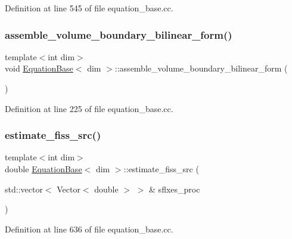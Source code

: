 Definition at line 545 of file equation\+\_\+base.\+cc.

\mbox{\label{class_equation_base_a42472101cbaeab32d22c4e8ff1dc9830}} 
\subsubsection{\texorpdfstring{assemble\+\_\+volume\+\_\+boundary\+\_\+bilinear\+\_\+form()}{assemble\_volume\_boundary\_bilinear\_form()}}
{\footnotesize\ttfamily template$<$int dim$>$ \\
void \hyperlink{class_equation_base}{Equation\+Base}$<$ dim $>$\+::assemble\+\_\+volume\+\_\+boundary\+\_\+bilinear\+\_\+form (\begin{DoxyParamCaption}{ }\end{DoxyParamCaption})\hspace{0.3cm}{\ttfamily [virtual]}}



Definition at line 225 of file equation\+\_\+base.\+cc.

\mbox{\label{class_equation_base_a1f36aebd8d54a082db3b2d2a621e67d6}} 
\subsubsection{\texorpdfstring{estimate\+\_\+fiss\+\_\+src()}{estimate\_fiss\_src()}}
{\footnotesize\ttfamily template$<$int dim$>$ \\
double \hyperlink{class_equation_base}{Equation\+Base}$<$ dim $>$\+::estimate\+\_\+fiss\+\_\+src (\begin{DoxyParamCaption}\item[{std\+::vector$<$ Vector$<$ double $>$ $>$ \&}]{sflxes\+\_\+proc }\end{DoxyParamCaption})}



Definition at line 636 of file equation\+\_\+base.\+cc.

